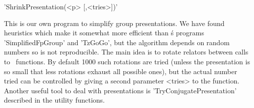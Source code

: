 
'ShrinkPresentation(<p> [,<tries>])'

This is our  own program to simplify group presentations.  We have found
heuristics which make it somewhat  more efficient than \GAP\' s programs
'SimplifiedFpGroup' and  'TzGoGo', but  the algorithm depends  on random
numbers so  is not  reproducible. The  main idea  is to  rotate relators
between calls  to \GAP\  functions. By default  1000 such  rotations are
tried (unless the  presentation is so small that  less rotations exhaust
all possible  ones), but the  actual number  tried can be  controlled by
giving a second  parameter <tries> to the function.  Another useful tool
to deal  with presentations  is 'TryConjugatePresentation'  described in
the utility functions.

